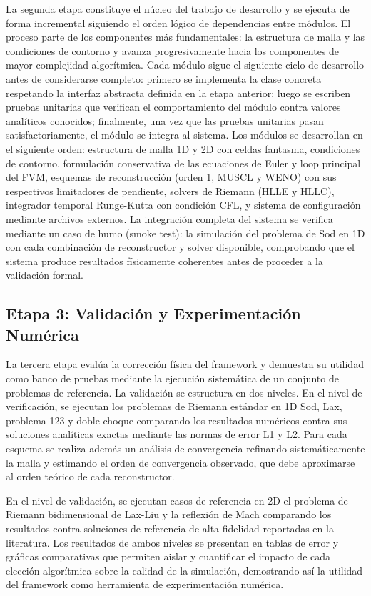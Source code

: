 \documentclass[11pt,openany]{book}
\begin{document}
La segunda etapa constituye el núcleo del trabajo de desarrollo y se ejecuta de forma incremental siguiendo el orden lógico de dependencias entre módulos. El proceso parte de los componentes más fundamentales: la estructura de malla y las condiciones de contorno y avanza progresivamente hacia los componentes de mayor complejidad algorítmica.
Cada módulo sigue el siguiente ciclo de desarrollo antes de considerarse completo: primero se implementa la clase concreta respetando la interfaz abstracta definida en la etapa anterior; luego se escriben pruebas unitarias que verifican el comportamiento del módulo contra valores analíticos conocidos; finalmente, una vez que las pruebas unitarias pasan satisfactoriamente, el módulo se integra al sistema. Los módulos se desarrollan en el siguiente orden: estructura de malla 1D y 2D con celdas fantasma, condiciones de contorno, formulación conservativa de las ecuaciones de Euler y loop principal del FVM, esquemas de reconstrucción (orden 1, MUSCL y WENO) con sus respectivos limitadores de pendiente, solvers de Riemann (HLLE y HLLC), integrador temporal Runge-Kutta con condición CFL, y sistema de configuración mediante archivos externos.
La integración completa del sistema se verifica mediante un caso de humo (smoke test): la simulación del problema de Sod en 1D con cada combinación de reconstructor y solver disponible, comprobando que el sistema produce resultados físicamente coherentes antes de proceder a la validación formal.

\subsection{Etapa 3: Validación y Experimentación Numérica}

La tercera etapa evalúa la corrección física del framework y demuestra su utilidad como banco de pruebas mediante la ejecución sistemática de un conjunto de problemas de referencia. La validación se estructura en dos niveles.
En el nivel de verificación, se ejecutan los problemas de Riemann estándar en 1D Sod, Lax, problema 123 y doble choque comparando los resultados numéricos contra sus soluciones analíticas exactas mediante las normas de error L1 y L2. Para cada esquema se realiza además un análisis de convergencia refinando sistemáticamente la malla y estimando el orden de convergencia observado, que debe aproximarse al orden teórico de cada reconstructor.

En el nivel de validación, se ejecutan casos de referencia en 2D el problema de Riemann bidimensional de Lax-Liu y la reflexión de Mach comparando los resultados contra soluciones de referencia de alta fidelidad reportadas en la literatura. Los resultados de ambos niveles se presentan en tablas de error y gráficas comparativas que permiten aislar y cuantificar el impacto de cada elección algorítmica sobre la calidad de la simulación, demostrando así la utilidad del framework como herramienta de experimentación numérica.
\end{document}
